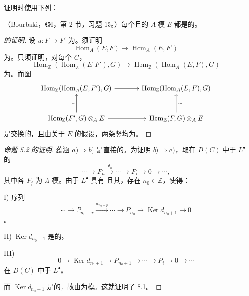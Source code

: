 证明时使用下列：

\begin{SGAresult}{}{}
（Bourbaki，《》I，第 2 节，习题 15。）每个且的 $A$-模 $E$ 都是的。
\end{SGAresult}
\begin{proof}[的证明]
设 $u:F\to F'$ 为。须证明
\[
\operatorname{Hom}_A(E,F)\longrightarrow\operatorname{Hom}_A(E,F')
\]
为。只须证明，对每个 $G$，
\[
\operatorname{Hom}_{\mathbb Z}(\operatorname{Hom}_A(E,F'),G)
\longrightarrow\operatorname{Hom}_{\mathbb Z}(\operatorname{Hom}_A(E,F),G)
\]
为。而图
\[
\begin{tikzcd}[column sep=large,row sep=large]
\operatorname{Hom}_{\mathbb Z}(\operatorname{Hom}_A(E,F'),G)
\arrow[r]&
\operatorname{Hom}_{\mathbb Z}(\operatorname{Hom}_A(E,F),G)\\
\operatorname{Hom}_{\mathbb Z}(F',G)\otimes_A E\arrow[r]\arrow[u,"\sim"]&
\operatorname{Hom}_{\mathbb Z}(F,G)\otimes_A E\arrow[u,"\sim"']
\end{tikzcd}
\]
是交换的，且由关于 $E$ 的假设，两条竖均为。
\end{proof}

\begin{proof}[命题 5.2 的证明]
蕴涵 $a)\Rightarrow b)$ 是直接的。为证明 $b)\Rightarrow a)$，取在 $D(C)$ 中于 $L^\bullet$ 的
\[
\cdots\longrightarrow P_n\xrightarrow{d_n}\cdots\longrightarrow P_i\longrightarrow0\longrightarrow\cdots,
\]
其中各 $P_j$ 为 $A$-模。由于 $L^\bullet$ 具有 且其，存在 $n_0\in\mathbb Z$，使得：

I) 序列
\[
\cdots\longrightarrow P_{n_0-p}\xrightarrow{d_{n_0-p}}\cdots
\longrightarrow P_{n_0}\longrightarrow\operatorname{Ker}d_{n_0+1}\longrightarrow0
\]
。

II) $\operatorname{Ker}d_{n_0+1}$ 是的。

III) 
\[
0\longrightarrow\operatorname{Ker}d_{n_0+1}\longrightarrow P_{n_0+1}
\longrightarrow\cdots\longrightarrow P_i\longrightarrow0\longrightarrow\cdots
\]
在 $D(C)$ 中于 $L^\bullet$。

而 $\operatorname{Ker}d_{n_0+1}$ 是的，故由为模。这就证明了 8.1。
\end{proof}

